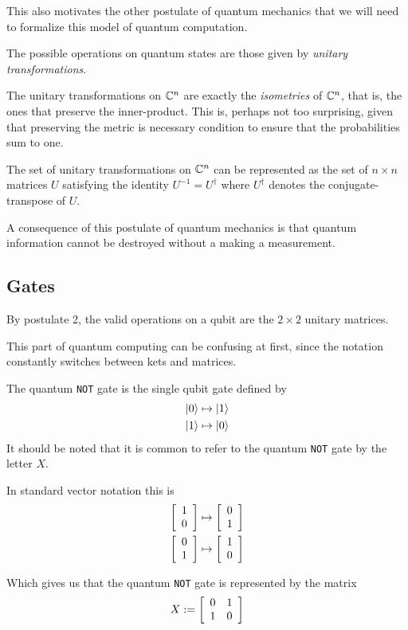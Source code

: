    This also motivates the other postulate of quantum mechanics that we will need to formalize this model of 
    quantum computation. 

    \begin{postulate}
        The possible operations on quantum states are those given by \emph{unitary transformations}.
    \end{postulate}

    The unitary transformations on $\mathbb{C}^n$ are exactly the \emph{isometries} of $\mathbb{C}^n$, that is, the ones that 
    preserve the inner-product. This is, perhaps not too surprising, given that preserving the metric is necessary 
    condition to ensure that the probabilities sum to one. 

    \begin{definition}
        The set of unitary transformations on $\mathbb{C}^n$ can be represented as the set of $n \times n$ matrices $U$ 
        satisfying the identity $U^{-1} = U^\dagger$ where $U^\dagger$ denotes the conjugate-transpose of $U$.
    \end{definition}

    A consequence of this postulate of quantum mechanics is that quantum information cannot be destroyed without a 
    making a measurement.

    
    
\subsection{Gates}
        
        By postulate 2, the valid operations on a qubit are the $2 \times 2$ unitary matrices.
        

        This part of quantum computing can be confusing at first, since the notation constantly switches between 
        kets and matrices.

        \begin{example}
            The quantum \texttt{NOT} gate is the single qubit gate defined by
            \begin{align*}
                \ket{0} &\mapsto \ket{1} \\
                \ket{1} &\mapsto \ket{0}
            \end{align*}
            It should be noted that it is common to refer to the quantum \texttt{NOT} gate by the letter $X$.

            In standard vector notation this is
            \begin{align*}
                \left[\begin{array}{r}1\\0\end{array}\right] &\mapsto \left[\begin{array}{r}0\\1\end{array}\right] \\
                \left[\begin{array}{r}0\\1\end{array}\right] &\mapsto \left[\begin{array}{r}1\\0\end{array}\right] 
            \end{align*}

            Which gives us that the quantum \texttt{NOT} gate is represented by the matrix
            \[
                X := \left[\begin{array}{rr}0&1\\1&0\end{array}\right]
            \]
        \end{example}

